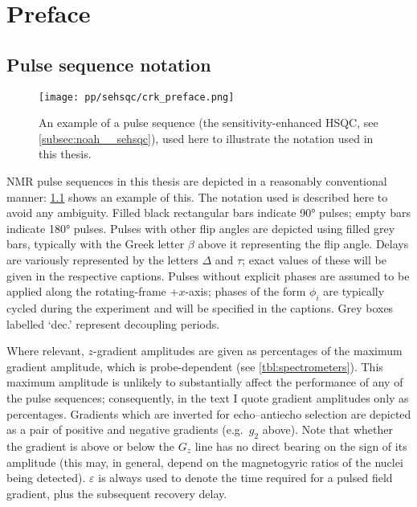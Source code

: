 \chapter{Preface}

\section*{Pulse sequence notation}

\begin{figure}[ht]
    \centering
    \texttt{[image: pp/sehsqc/crk\_preface.png]}
    \caption[Example pulse sequence to illustrate notation]{An example of a pulse sequence (the sensitivity-enhanced HSQC, see \cref{subsec:noah__sehsqc}), used here to illustrate the notation used in this thesis.}
    \label{fig:preface_sehsqc}
\end{figure}

NMR pulse sequences in this thesis are depicted in a reasonably conventional manner: \cref{fig:preface_sehsqc} shows an example of this.
The notation used is described here to avoid any ambiguity.
Filled black rectangular bars indicate \ang{90} pulses; empty bars indicate \ang{180} pulses.
Pulses with other flip angles are depicted using filled grey bars, typically with the Greek letter $\beta$ above it representing the flip angle.
Delays are variously represented by the letters $\Delta$ and $\tau$; exact values of these will be given in the respective captions.
Pulses without explicit phases are assumed to be applied along the rotating-frame $+x$-axis; phases of the form $\phi_i$ are typically cycled during the experiment and will be specified in the captions.
Grey boxes labelled `dec.' represent decoupling periods.

Where relevant, $z$-gradient amplitudes are given as percentages of the maximum gradient amplitude, which is probe-dependent (see \cref{tbl:spectrometers}).
This maximum amplitude is unlikely to substantially affect the performance of any of the pulse sequences; consequently, in the text I quote gradient amplitudes only as percentages.
Gradients which are inverted for echo--antiecho selection are depicted as a pair of positive and negative gradients (e.g.\ $g_2$ above).
Note that whether the gradient is above or below the $G_z$ line has no direct bearing on the sign of its amplitude (this may, in general, depend on the magnetogyric ratios of the nuclei being detected).
$\varepsilon$ is always used to denote the time required for a pulsed field gradient, plus the subsequent recovery delay.

